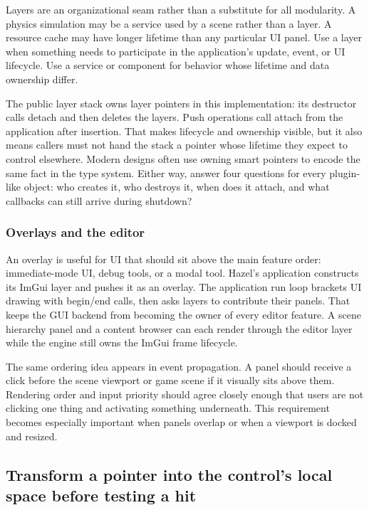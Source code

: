 Layers are an organizational seam rather than a substitute for all modularity. A physics simulation may be a service used by a scene rather than a layer. A resource cache may have longer lifetime than any particular UI panel. Use a layer when something needs to participate in the application's update, event, or UI lifecycle. Use a service or component for behavior whose lifetime and data ownership differ.

The public layer stack owns layer pointers in this implementation: its destructor calls detach and then deletes the layers. Push operations call attach from the application after insertion. That makes lifecycle and ownership visible, but it also means callers must not hand the stack a pointer whose lifetime they expect to control elsewhere. Modern designs often use owning smart pointers to encode the same fact in the type system. Either way, answer four questions for every plugin-like object: who creates it, who destroys it, when does it attach, and what callbacks can still arrive during shutdown?

\subsubsection{Overlays and the editor}\label{05-engine-i-ch013-overlays-and-the-editor}

An overlay is useful for UI that should sit above the main feature order: immediate-mode UI, debug tools, or a modal tool. Hazel's application constructs its ImGui layer and pushes it as an overlay. The application run loop brackets UI drawing with begin/end calls, then asks layers to contribute their panels. That keeps the GUI backend from becoming the owner of every editor feature. A scene hierarchy panel and a content browser can each render through the editor layer while the engine still owns the ImGui frame lifecycle.

The same ordering idea appears in event propagation. A panel should receive a click before the scene viewport or game scene if it visually sits above them. Rendering order and input priority should agree closely enough that users are not clicking one thing and activating something underneath. This requirement becomes especially important when panels overlap or when a viewport is docked and resized.

\subsection{Transform a pointer into the control's local space before testing a hit}\label{05-engine-i-ch013-transform-a-pointer-into-the-controls-local-space-before-testing-a-hit}

